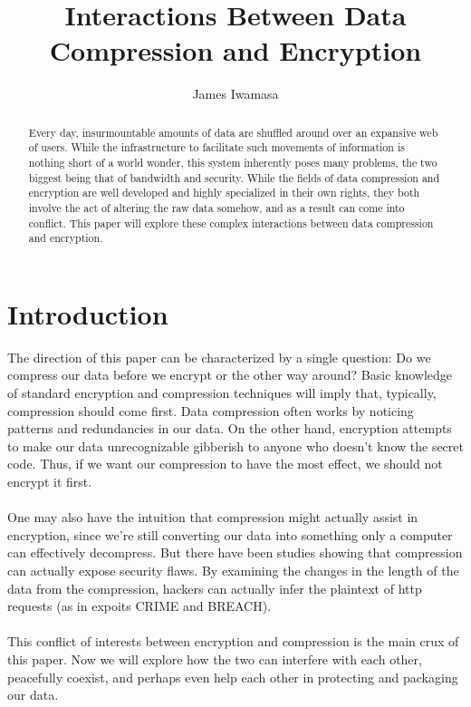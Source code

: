 \documentclass[11pt]{article}
\begin{document}
\title{Interactions Between Data Compression and Encryption}
\author{James Iwamasa}
\maketitle

\begin{abstract}
Every day, insurmountable amounts of data are shuffled around over an expansive web of users. 
While the infrastructure to facilitate such movements of information is nothing short of a world wonder, 
this system inherently poses many problems, the two biggest being that of bandwidth and security. 
While the fields of data compression and encryption are well developed and highly specialized in their 
own rights, they both involve the act of altering the raw data somehow, and as a result can come into 
conflict. This paper will explore these complex interactions between data compression and encryption.
\end{abstract}


\section{Introduction}\label{intro-sect}
The direction of this paper can be characterized by a single question: Do we compress our data before we 
encrypt or the other way around? Basic knowledge of standard encryption and compression techniques will 
imply that, typically, compression should come first. Data compression often works by noticing patterns and 
redundancies in our data. On the other hand, encryption attempts to make our data unrecognizable gibberish 
to anyone who doesn't know the secret code. Thus, if we want our compression to have the most effect, 
we should not encrypt it first.\\\\
One may also have the intuition that compression might actually assist in encryption, 
since we're still converting our data into something only a computer can effectively decompress. 
But there have been studies\cite{kelsey}\cite{breach} showing that compression can actually expose security flaws. 
By examining the changes in the length of the data from the compression, 
hackers can actually infer the plaintext of http requests (as in expoits CRIME and BREACH).\\\\
This conflict of interests between encryption and compression is the main crux of this paper. 
Now we will explore how the two can interfere with each other, peacefully coexist, and perhaps 
even help each other in protecting and packaging our data. 
\end{document}
